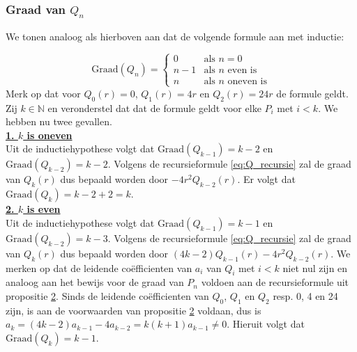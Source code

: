 \documentclass[12pt,a4paper]{article}
\theoremstyle{definition}
\numberwithin{equation}{section}
\begin{document}
\subsubsection*{Graad van $Q_n$}
We tonen analoog als hierboven aan dat de volgende formule aan met inductie: 

\begin{equation*}
\text{Graad$(Q_n)=$}
\begin{cases}
  0 & \text{als $n=0$}\\
n-1 & \text{als $n$ even is}\\
n & \text{als $n$ oneven is}
\end{cases}
\end{equation*}
Merk op dat voor $Q_0(r) = 0$, $Q_1(r) = 4r$ en  $Q_2(r)=24r$ de formule geldt.
Zij $k\in\mathbb{N}$ en veronderstel dat dat de formule geldt voor elke $P_i$ met $i<k$. We hebben nu twee gevallen.\\
%
\underline{\textbf{1. $k$ is oneven}}\\
Uit de inductiehypothese volgt dat $\text{Graad}(Q_{k-1}) = k-2$ en $\text{Graad}(Q_{k-2}) = k-2$.
Volgens de recursieformule \eqref{eq:Q_recursie} zal de graad van $Q_k(r)$ dus bepaald worden door $-4r^2Q_{k-2}(r)$. Er volgt dat $\text{Graad}(Q_k) = k-2+2 = k.$
\\
\underline{\textbf{2. $k$ is even}}\\
Uit de inductiehypothese volgt dat $\text{Graad}(Q_{k-1}) = k-1$ en $\text{Graad}(Q_{k-2}) = k-3$.
Volgens de recursieformule \eqref{eq:Q_recursie} zal de graad van $Q_k(r)$ dus bepaald worden door $(4k-2)Q_{k-1}(r)-4r^2Q_{k-2}(r)$. We merken op dat de leidende coëfficienten van $a_i$ van $Q_i$ met $i<k$  niet nul zijn en analoog aan het bewijs voor de graad van $P_n$ voldoen aan de recursieformule uit propositie \hyperref[thm:prop2]{2}.
Sinds de leidende coëfficienten van $Q_0$, $Q_1$ en $Q_2$ resp. 0, 4 en 24 zijn, is aan  de voorwaarden van propositie \hyperref[thm:prop2]{2} voldaan, dus is $a_k = (4k-2)a_{k-1} - 4a_{k-2} = k(k+1)a_{k-1} \neq 0$.
Hieruit volgt dat $\text{Graad}(Q_k) = k-1$.
\end{document}
